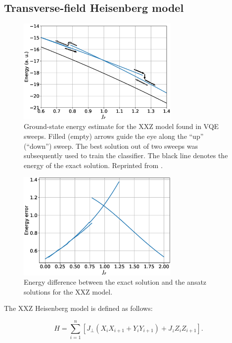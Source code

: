 \subsection{Transverse-field Heisenberg model}

\begin{figure}
    \centering
    \includegraphics[width=0.7\textwidth]{figures/vqe_hysteresis_xxz_new.eps}
    \caption{Ground-state energy estimate for the XXZ model found
    in VQE sweeps. Filled (empty) arrows guide the eye along the
    “up” (“down”) sweep. The best solution out of two sweeps was
    subsequently used to train the classifier. The black line denotes the energy of the exact solution. Reprinted from \cite{uvarov_machine_2020}.}
    \label{fig:vqe_hysteresis}
\end{figure}

\begin{figure}
    \centering
    \includegraphics[width=0.7\textwidth]{figures/dE_xxz_best.eps}
    \caption{Energy difference between the exact solution and the ansatz solutions for the XXZ model.}
    \label{fig:dE_xxz}
\end{figure}

The XXZ Heisenberg model is defined as follows:

\begin{equation}
    \label{eq:heisenberg_xxz}
    H = \sum_{i=1}^n \left[J_\perp\left(X_i X_{i+1} + Y_i Y_{i+1}\right)
        + J_z Z_i Z_{i+1}\right].
\end{equation}

